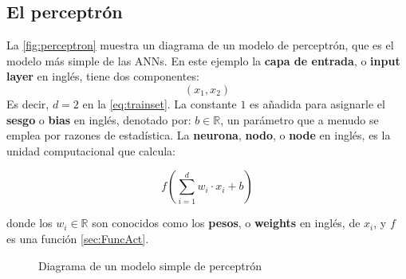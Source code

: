 \subsection{El perceptrón}\label{sec:perceptron}

La \autoref{fig:perceptron} muestra un diagrama de un modelo de perceptrón, que es el modelo más simple de las \acs{ANN}s. En este ejemplo la \textbf{capa de entrada}, o \textbf{input layer} en inglés, tiene dos componentes:
$$(x_1,x_2)$$
Es decir, $d=2$ en la \autoref{eq:trainset}. La constante $1$ es añadida para asignarle el \textbf{sesgo} o \textbf{bias} en inglés, denotado por: $b \in \mathbb{R}$, un parámetro que a menudo se emplea por razones de estadística. La \textbf{neurona}, \textbf{nodo}, o \textbf{node} en inglés, es la unidad computacional que calcula:

\begin{equation}
  \label{eq:neuronfun}
  f\left( \sum_{i=1}^dw_i\cdot x_i + b \right)
\end{equation}

donde los $w_i \in \mathbb{R}$ son conocidos como los \textbf{pesos}, o \textbf{weights} en inglés, de $x_i$, y $f$ es una función \autoref{sec:FuncAct}.
\begin{figure}[hb]
  \centering

\caption{Diagrama de un modelo simple de perceptrón}
\label{fig:perceptron}
\end{figure}

